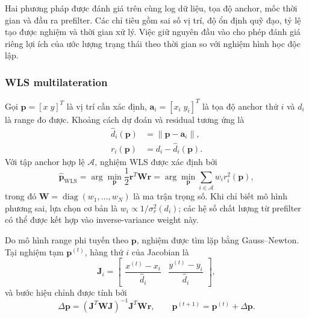 \documentclass[
  a4paper,
]{report}
\begin{document}
Hai phương pháp được đánh giá trên cùng log dữ liệu, tọa độ anchor, mốc thời
gian và đầu ra prefilter. Các chỉ tiêu gồm sai số vị trí, độ ổn định quỹ đạo,
tỷ lệ tạo được nghiệm và thời gian xử lý. Việc giữ nguyên đầu vào cho phép
đánh giá riêng lợi ích của ước lượng trạng thái theo thời gian so với nghiệm
hình học độc lập.

\subsubsection{WLS multilateration}

Gọi $\mathbf p=[x\;y]^T$ là vị trí cần xác định,
$\mathbf a_i=[x_i\;y_i]^T$ là tọa độ anchor thứ $i$ và $d_i$ là range đo
được. Khoảng cách dự đoán và residual tương ứng là
\begin{align}
  \widehat d_i(\mathbf p)&=
  \lVert\mathbf p-\mathbf a_i\rVert,\\
  r_i(\mathbf p)&=d_i-\widehat d_i(\mathbf p).
  \label{eq:wls-range-residual}
\end{align}
Với tập anchor hợp lệ $\mathcal A$, nghiệm WLS được xác định bởi
\begin{equation}
  \widehat{\mathbf p}_{\mathrm{WLS}}=
  \arg\min_{\mathbf p}
  \frac{1}{2}\mathbf r^T\mathbf W\mathbf r
  =\arg\min_{\mathbf p}
  \sum_{i\in\mathcal A}w_i r_i^2(\mathbf p),
  \label{eq:wls-objective-detailed}
\end{equation}
trong đó $\mathbf W=\operatorname{diag}(w_1,\ldots,w_N)$ là ma trận trọng
số. Khi chỉ biết mô hình phương sai, lựa chọn cơ bản là
$w_i\propto 1/\sigma_r^2(d_i)$; các hệ số chất lượng từ prefilter có thể được
kết hợp vào inverse-variance weight này.

Do mô hình range phi tuyến theo $\mathbf p$, nghiệm được tìm lặp bằng
Gauss--Newton. Tại nghiệm tạm $\mathbf p^{(t)}$, hàng thứ $i$ của Jacobian là
\begin{equation}
  \mathbf J_i=
  \begin{bmatrix}
  \dfrac{x^{(t)}-x_i}{\widehat d_i} &
  \dfrac{y^{(t)}-y_i}{\widehat d_i}
  \end{bmatrix},
  \label{eq:wls-jacobian}
\end{equation}
và bước hiệu chỉnh được tính bởi
\begin{equation}
  \Delta\mathbf p=
  (\mathbf J^T\mathbf W\mathbf J)^{-1}
  \mathbf J^T\mathbf W\mathbf r,
  \qquad
  \mathbf p^{(t+1)}=\mathbf p^{(t)}+\Delta\mathbf p.
  \label{eq:wls-gauss-newton}
\end{equation}
\end{document}

